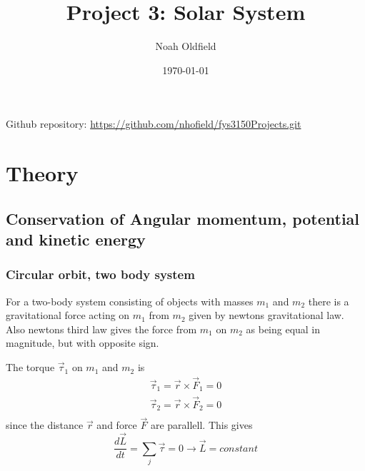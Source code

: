 \documentclass[aip,nobalancelastpage,
twocolumn,
rsi,%
 amsmath,amssymb,
 reprint,%
]{revtex4}
\begin{document}

\title{Project 3: Solar System}

\author{Noah Oldfield}

%

\date{\today}%

\begin{abstract}


\end{abstract}

\maketitle

Github repository: \url{https://github.com/nhofield/fys3150Projects.git} 


\section{Theory}

\subsection{Conservation of Angular momentum, potential and kinetic energy}
\subsubsection{Circular orbit, two body system}
For a two-body system consisting of objects with masses $m_1$ and $m_2$ there is a gravitational force acting on $m_1$ from $m_2$ given by newtons gravitational law. Also newtons third law gives the force from $m_1$ on $m_2$ as being equal in magnitude, but with opposite sign.\par
The torque $\vec{\tau}_1$ on $m_1$ and $m_2$ is
\begin{align}
\vec{\tau}_1 = \vec{r} \times \vec{F}_1 = 0 \\
\vec{\tau}_2 = \vec{r} \times \vec{F}_2 = 0 \\
\end{align}
since the distance $\vec{r}$ and force $\vec{F}$ are parallell.
This gives
\begin{equation}
\frac{d \vec{L}}{dt} = \sum_j \vec{\tau} = 0 \longrightarrow \vec{L} = constant
\end{equation}
\end{document}
